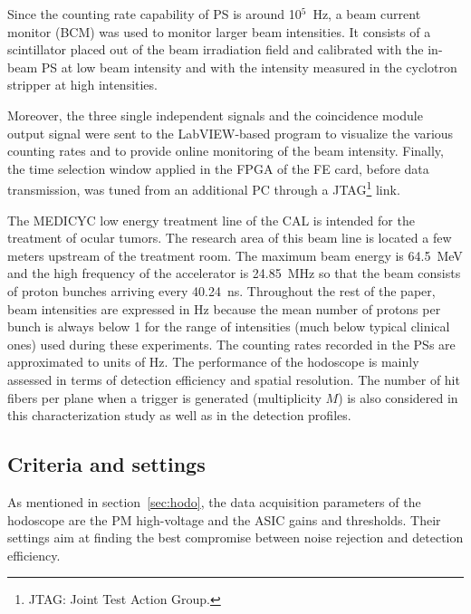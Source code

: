 \documentclass[a4paper,11pt]{article}
\begin{document}
Since the counting rate capability of PS is around {10}$^{5}$~Hz, a beam current monitor (BCM) \cite{Kelleter2017, Martins2020} was used to monitor larger beam intensities. It consists of a scintillator placed out of the beam irradiation field and calibrated with the in-beam PS at low beam intensity and with the intensity measured in the cyclotron stripper at high intensities. 

Moreover, the three single independent signals and the coincidence module output signal were sent to the LabVIEW-based program to visualize the various counting rates and to provide online monitoring of the beam intensity. 
Finally, the time selection window applied in the FPGA of the FE card, before data transmission, was tuned from an additional PC through a JTAG\footnote{JTAG: Joint Test Action Group.} link.

The MEDICYC low energy treatment line of the CAL is intended for the treatment of ocular tumors. The research area of this beam line is located a few meters upstream of the treatment room. The maximum beam energy is 64.5~MeV and the high frequency of the accelerator is 24.85~MHz so that the beam consists of proton bunches arriving every 40.24~ns. Throughout the rest of the paper, beam intensities are expressed in Hz because the mean number of protons per bunch is always below 1 for the range of intensities (much below typical clinical ones) used during these experiments. The counting rates recorded in the PSs are approximated to units of Hz.
The performance of the hodoscope is mainly assessed in terms of detection efficiency and spatial resolution. The number of hit fibers per plane when a trigger is generated (multiplicity $M$) is also considered in this characterization study as well as in the detection profiles.

\subsection{Criteria and settings}
\label{sec:Settings}

As mentioned in section~\ref{sec:hodo}, the data acquisition parameters of the hodoscope are the PM high-voltage and the ASIC gains and thresholds. Their settings aim at finding the best compromise between noise rejection and detection efficiency.
\end{document}
